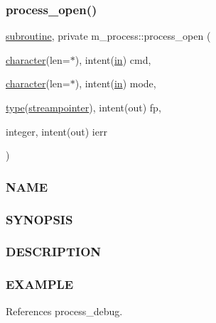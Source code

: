 \subsubsection{\texorpdfstring{process\+\_\+open()}{process\_open()}}
{\footnotesize\ttfamily \hyperlink{M__stopwatch_83_8txt_acfbcff50169d691ff02d4a123ed70482}{subroutine}, private m\+\_\+process\+::process\+\_\+open (\begin{DoxyParamCaption}\item[{\hyperlink{option__stopwatch_83_8txt_abd4b21fbbd175834027b5224bfe97e66}{character}(len=$\ast$), intent(\hyperlink{M__journal_83_8txt_afce72651d1eed785a2132bee863b2f38}{in})}]{cmd,  }\item[{\hyperlink{option__stopwatch_83_8txt_abd4b21fbbd175834027b5224bfe97e66}{character}(len=$\ast$), intent(\hyperlink{M__journal_83_8txt_afce72651d1eed785a2132bee863b2f38}{in})}]{mode,  }\item[{\hyperlink{stop__watch_83_8txt_a70f0ead91c32e25323c03265aa302c1c}{type}(\hyperlink{structm__process_1_1streampointer}{streampointer}), intent(out)}]{fp,  }\item[{integer, intent(out)}]{ierr }\end{DoxyParamCaption})\hspace{0.3cm}{\ttfamily [private]}}



\subsubsection*{N\+A\+ME}

\subsubsection*{S\+Y\+N\+O\+P\+S\+IS}

\subsubsection*{D\+E\+S\+C\+R\+I\+P\+T\+I\+ON}

\subsubsection*{E\+X\+A\+M\+P\+LE}

References process\+\_\+debug.

